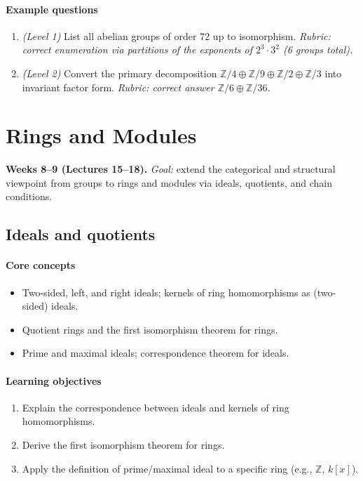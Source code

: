 \documentclass{article}
\begin{document}
\paragraph{Example questions}
\begin{enumerate}[nosep]
  \item \emph{(Level 1)} List all abelian groups of order 72 up to isomorphism. \emph{Rubric: correct enumeration via partitions of the exponents of $2^3\cdot 3^2$ (6 groups total).}
  \item \emph{(Level 2)} Convert the primary decomposition $\mathbb{Z}/4 \oplus \mathbb{Z}/9 \oplus \mathbb{Z}/2 \oplus \mathbb{Z}/3$ into invariant factor form. \emph{Rubric: correct answer $\mathbb{Z}/6 \oplus \mathbb{Z}/36$.}
\end{enumerate}

\section{Rings and Modules}
\textbf{Weeks 8--9 (Lectures 15--18).} \emph{Goal:} extend the categorical and structural viewpoint from groups to rings and modules via ideals, quotients, and chain conditions.

\subsection{Ideals and quotients}
\paragraph{Core concepts}
\begin{itemize}[nosep]
  \item Two-sided, left, and right ideals; kernels of ring homomorphisms as (two-sided) ideals.
  \item Quotient rings and the first isomorphism theorem for rings.
  \item Prime and maximal ideals; correspondence theorem for ideals.
\end{itemize}
\paragraph{Learning objectives}
\begin{enumerate}[nosep]
  \item Explain the correspondence between ideals and kernels of ring homomorphisms.
  \item Derive the first isomorphism theorem for rings.
  \item Apply the definition of prime/maximal ideal to a specific ring (e.g., $\mathbb{Z}$, $k[x]$).
\end{enumerate}
\end{document}
